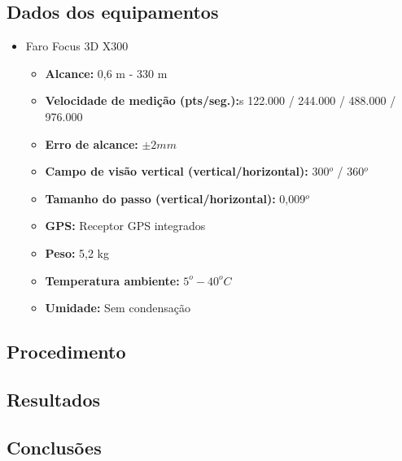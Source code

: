 \subsection{Dados dos equipamentos}

\begin{itemize}
  \item Faro Focus 3D X300
  \begin{itemize}
    \item \textbf{Alcance:} 0,6 m - 330 m
    \item \textbf{Velocidade de medição (pts/seg.):}s 122.000 / 244.000 /
    488.000 / 976.000
    \item \textbf{Erro de alcance:} $\pm 2 mm$
    \item \textbf{Campo de visão vertical (vertical/horizontal):} 300$^o$ /
    360$^o$
    \item \textbf{Tamanho do passo (vertical/horizontal):} 0,009$^o$
    \item \textbf{GPS:} Receptor GPS integrados
    \item \textbf{Peso:} 5,2 kg
    \item \textbf{Temperatura ambiente:} $5^o - 40^o C$
    \item \textbf{Umidade:} Sem condensação
  \end{itemize}
\end{itemize}

\subsection{Procedimento}

\subsection{Resultados} 

\subsection{Conclusões}
